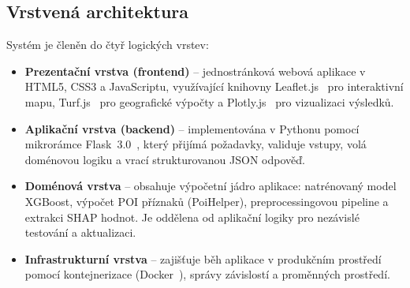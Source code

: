 \subsection*{Vrstvená architektura}
Systém je členěn do čtyř logických vrstev:
\begin{itemize}
    \item \textbf{Prezentační vrstva (frontend)} -- jednostránková webová aplikace v HTML5, CSS3 a JavaScriptu, využívající knihovny Leaflet.js~\cite{LeafletJS} pro interaktivní mapu, Turf.js~\cite{TurfJS} pro geografické výpočty a Plotly.js~\cite{PlotlyJS} pro vizualizaci výsledků.
    \item \textbf{Aplikační vrstva (backend)} -- implementována v Pythonu pomocí mikrorámce Flask~3.0~\cite{Flask}, který přijímá požadavky, validuje vstupy, volá doménovou logiku a vrací strukturovanou JSON odpověď.
    \item \textbf{Doménová vrstva} -- obsahuje výpočetní jádro aplikace: natrénovaný model XGBoost, výpočet POI příznaků (PoiHelper), preprocessingovou pipeline a extrakci SHAP hodnot. Je oddělena od aplikační logiky pro nezávislé testování a aktualizaci.
    \item \textbf{Infrastrukturní vrstva} -- zajišťuje běh aplikace v produkčním prostředí pomocí kontejnerizace (Docker~\cite{Docker}), správy závislostí a proměnných prostředí.
\end{itemize}

